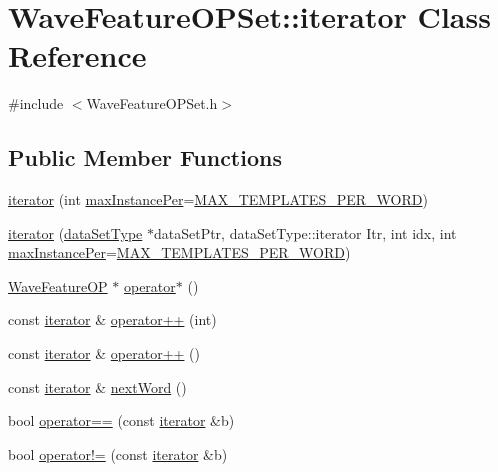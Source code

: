 \hypertarget{class_wave_feature_o_p_set_1_1iterator}{\section{Wave\+Feature\+O\+P\+Set\+:\+:iterator Class Reference}
\label{class_wave_feature_o_p_set_1_1iterator}
}


{\ttfamily \#include $<$Wave\+Feature\+O\+P\+Set.\+h$>$}

\subsection*{Public Member Functions}
\begin{DoxyCompactItemize}
\item 
\hyperlink{class_wave_feature_o_p_set_1_1iterator_a106ac8443c927a9c40520b478a80372c}{iterator} (int \hyperlink{pro4__demo__1_8cpp_adc01d2f6980a1af5c3ddc83d847dafa0}{max\+Instance\+Per}=\hyperlink{configure__dtw_8h_a5e1cc8ac4ebc0912817c618ccc9d823b}{M\+A\+X\+\_\+\+T\+E\+M\+P\+L\+A\+T\+E\+S\+\_\+\+P\+E\+R\+\_\+\+W\+O\+R\+D})
\item 
\hyperlink{class_wave_feature_o_p_set_1_1iterator_ad346abddf10824562ddc0a8ac7676e39}{iterator} (\hyperlink{class_wave_feature_o_p_set_a7145e9463a1fb85ce4c239552bf4e8e0}{data\+Set\+Type} $\ast$data\+Set\+Ptr, data\+Set\+Type\+::iterator Itr, int idx, int \hyperlink{pro4__demo__1_8cpp_adc01d2f6980a1af5c3ddc83d847dafa0}{max\+Instance\+Per}=\hyperlink{configure__dtw_8h_a5e1cc8ac4ebc0912817c618ccc9d823b}{M\+A\+X\+\_\+\+T\+E\+M\+P\+L\+A\+T\+E\+S\+\_\+\+P\+E\+R\+\_\+\+W\+O\+R\+D})
\item 
\hyperlink{class_wave_feature_o_p}{Wave\+Feature\+O\+P} $\ast$ \hyperlink{class_wave_feature_o_p_set_1_1iterator_a5b55475159717135436bfaaac5fc5702}{operator$\ast$} ()
\item 
const \hyperlink{class_wave_feature_o_p_set_1_1iterator}{iterator} \& \hyperlink{class_wave_feature_o_p_set_1_1iterator_a9e47a4d0cf363ecce99432cc19f6c122}{operator++} (int)
\item 
const \hyperlink{class_wave_feature_o_p_set_1_1iterator}{iterator} \& \hyperlink{class_wave_feature_o_p_set_1_1iterator_ae32d8b6a50360369b67f22c938987a6c}{operator++} ()
\item 
const \hyperlink{class_wave_feature_o_p_set_1_1iterator}{iterator} \& \hyperlink{class_wave_feature_o_p_set_1_1iterator_a8958a82c281d0726ae26dec7f2ea6921}{next\+Word} ()
\item 
bool \hyperlink{class_wave_feature_o_p_set_1_1iterator_a429c2e56247bab88043c1de2dbb6551a}{operator==} (const \hyperlink{class_wave_feature_o_p_set_1_1iterator}{iterator} \&b)
\item 
bool \hyperlink{class_wave_feature_o_p_set_1_1iterator_a2d4e4835b6a46853d726a19dd3aab209}{operator!=} (const \hyperlink{class_wave_feature_o_p_set_1_1iterator}{iterator} \&b)
\end{DoxyCompactItemize}
